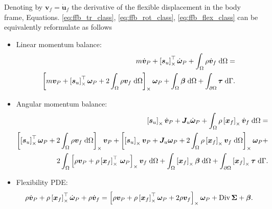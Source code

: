 \begin{proposition}
	Denoting by $\bm{v}_f = \dot{\bm{u}}_f$ the derivative of the flexible displacement in the body frame, Equations. \eqref{eq:ffb_tr_class}, \eqref{eq:ffb_rot_class}, \eqref{eq:ffb_flex_class} can be equivalently reformulate as follows
\begin{itemize}
	\item Linear momentum balance:
	\begin{equation}
	\label{eq:ffb_tr_pH}
	\begin{split}
	m\dot{\bm{v}}_P + \crmat{\bm{s}_u}^\top \dot{\bm{\omega}}_P +   \int_{\Omega} \rho \dot{\bm{v}}_f \d{\Omega}  = \\
	\crmat{m {\bm{v}_P} + {\crmat{\bm{s}_u}^\top \bm\omega_P} +2 \int_{\Omega} \rho {\bm{v}_f} \d{\Omega}} \bm\omega_P +  \int_{\Omega} \bm\beta \d{\Omega} + \int_{\partial \Omega} \bm\tau \d{\Gamma}.
	\end{split}
	\end{equation}
	\item Angular momentum balance:
	\begin{equation}
	\label{eq:ffb_rot_pH}
	\begin{split}
	\crmat{\bm{s}_u} \dot{\bm{v}}_P  + \bm{J}_u \dot{\bm\omega}_P + \int_{\Omega} \rho \crmat{\bm{x}_f} \dot{\bm{v}}_f \d{\Omega} = \\
	\crmat{\crmat{\bm{s}_u}^\top \bm\omega_P + 2 \int_{\Omega} \rho {\bm{v}_f} \d{\Omega}} \bm{v}_P + \crmat{\crmat{\bm{s}_u} \bm{v}_P + {\bm{J}_u \bm\omega_P} + 2 \int_{\Omega} \rho \crmat{\bm{x}_f} {\bm{v}}_f \d{\Omega}} \bm\omega_P + 
	\\
	2 \int_{\Omega} \left[\rho \bm{v}_P + \rho \crmat{\bm{x}_f}^\top \, \bm\omega_P\right]_\times \bm{v}_f \d{\Omega} + \int_{\Omega}\crmat{\bm{x}_f} \bm\beta \d{\Omega} + \int_{\partial \Omega}\crmat{\bm{x}_f} \bm{\tau} \d{\Gamma}.
	\end{split}
	\end{equation}
	\item Flexibility PDE:
	\begin{equation}
	\label{eq:ffb_flex_pH}
	\rho \dot{\bm{v}}_P + \rho \left[\bm{x}_f\right]_\times^\top \dot{\bm\omega}_P  + \rho \dot{\bm{v}}_f = \left[\rho \bm{v}_P + \rho \left[\bm{x}_f\right]_\times^\top \bm\omega_P + 2 \rho \bm{v}_f\right]_\times \bm\omega_P + \operatorname*{Div}{\bm\Sigma} + \bm\beta.
	\end{equation}
\end{itemize}
\end{proposition} 

